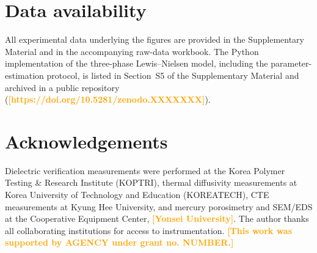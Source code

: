 \documentclass[preprint,a4paper]{elsarticle}
\newcommand{\hl}[1]{\textcolor{orange}{\textbf{[#1]}}}
\begin{document}
\section*{Data availability}
All experimental data underlying the figures are provided in the Supplementary Material and in the accompanying raw-data workbook. The Python implementation of the three-phase Lewis--Nielsen model, including the parameter-estimation protocol, is listed in Section~S5 of the Supplementary Material and archived in a public repository (\hl{https://doi.org/10.5281/zenodo.XXXXXXX}).

\section*{Acknowledgements}
Dielectric verification measurements were performed at the Korea Polymer Testing \& Research Institute (KOPTRI), thermal diffusivity measurements at Korea University of Technology and Education (KOREATECH), CTE measurements at Kyung Hee University, and mercury porosimetry and SEM/EDS at the Cooperative Equipment Center, \hl{Yonsei University}. The author thanks all collaborating institutions for access to instrumentation. \hl{This work was supported by AGENCY under grant no. NUMBER.}



\end{document}
